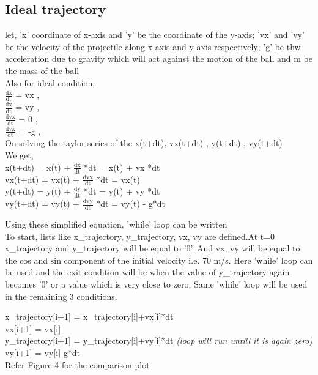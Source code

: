 \documentclass[11pt]{article}
\begin{document}
\begin{justify}
\subsection{Ideal trajectory}
\begin{raggedright}
let, 'x' coordinate of x-axis and 'y' be the coordinate of the y-axis; 'vx' and 'vy' be the velocity of the projectile along x-axis and y-axis respectively; 'g' be thw acceleration due to gravity which will act against the motion of the ball and m be the mass of the ball\\
Also for ideal condition,\\
$\frac{\text{dx}}{\text{dt}}$ = vx , \\
$\frac{\text{dx}}{\text{dt}}$ = vy , \\
$\frac{\text{dvx}}{\text{dt}}$ = 0 , \\
$\frac{\text{dvx}}{\text{dt}}$ = -g , \\
On solving the taylor series of the x(t+dt), vx(t+dt) , y(t+dt) , vy(t+dt)\\
We get,\\
x(t+dt) = x(t) + $\frac{\text{dx}}{\text{dt}}$ *dt = x(t) + vx *dt\\
vx(t+dt) = vx(t) + $\frac{\text{dvx}}{\text{dt}}$ *dt = vx(t)\\
y(t+dt) = y(t) + $\frac{\text{dy}}{\text{dt}}$ *dt = y(t) + vy *dt\\
vy(t+dt) = vy(t) + $\frac{\text{dvy}}{\text{dt}}$ *dt = vy(t) - g*dt\\

\end{raggedright}

\begin{raggedright}
\begin{justify}
Using these simplified equation, 'while' loop can be written\\
To start, lists like x\_trajectory, y\_trajectory, vx, vy are defined.At t=0 x\_trajectory and y\_trajectory will be equal to '0'. And vx, vy will be equal to the cos and sin component of the initial velocity i.e. 70 m/s. Here 'while' loop can be used and the exit condition will be when the value of y\_trajectory again becomes '0' or a value which is very close to zero. Same 'while' loop will be used in the remaining 3 conditions.
\end{justify}
\end{raggedright}

\begin{raggedright}
\begin{justify}
x\_trajectory[i+1] = x\_trajectory[i]+vx[i]*dt\\
vx[i+1] = vx[i]\\
y\_trajectory[i+1] = y\_trajectory[i]+vy[i]*dt \textit{(loop will run untill it is again zero)}\\
vy[i+1] = vy[i]-g*dt\\
Refer \hyperref[fig:ideal_trajectory]{Figure 4} for the comparison plot


\end{justify}
\end{raggedright}
\end{justify}
\end{document}
